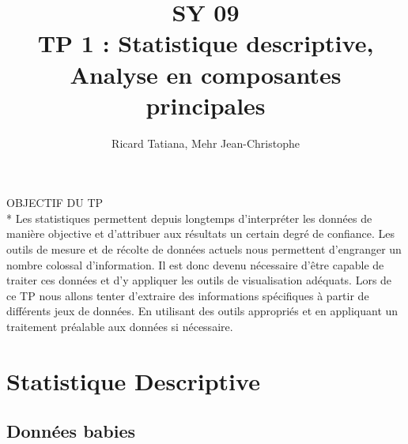 ﻿\documentclass[a4paper, 9pt]{article}
\title{SY 09 \\TP 1 :  Statistique descriptive, Analyse en composantes principales}
\author{Ricard Tatiana, Mehr Jean-Christophe}
\begin{document}
\maketitle

OBJECTIF DU TP 
\\* Les statistiques permettent depuis longtemps d’interpréter les données de manière objective et d’attribuer aux résultats un certain degré de confiance. Les outils de mesure et de récolte de données actuels nous permettent d’engranger un nombre colossal d’information. Il est donc devenu nécessaire d’être capable de traiter ces données et d’y appliquer les outils de visualisation adéquats.
Lors de ce TP nous allons tenter d’extraire des informations spécifiques à partir de différents jeux de données. En utilisant des outils appropriés et en appliquant un traitement préalable aux données si nécessaire.


\section{Statistique Descriptive}
\subsection{Donn\'ees babies}
\end{document}
